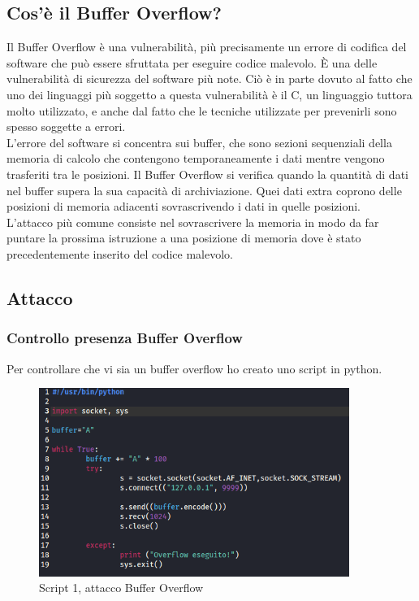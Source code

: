 \documentclass[12pt,letterpaper]{article} %
\begin{document}
\subsection{Cos'è  il Buffer Overflow?}
Il Buffer Overflow è una vulnerabilità, più precisamente un errore di codifica del software che può essere sfruttata per eseguire codice malevolo. È una delle vulnerabilità di sicurezza del software più note. Ciò è in parte dovuto al fatto che uno dei linguaggi più soggetto a questa vulnerabilità è il C, un linguaggio tuttora molto utilizzato, e anche dal fatto che  le tecniche utilizzate per prevenirli sono spesso soggette a errori.\\
L'errore del software si concentra sui buffer, che sono sezioni sequenziali della memoria di calcolo che contengono temporaneamente i dati mentre vengono trasferiti tra le posizioni. Il Buffer Overflow si verifica quando la quantità di dati nel buffer supera la sua capacità di archiviazione. Quei dati extra coprono delle posizioni di memoria adiacenti sovrascrivendo i dati in quelle posizioni.\\
 L'attacco più comune consiste nel sovrascrivere la memoria in modo da far puntare la prossima istruzione a una posizione di memoria dove è stato precedentemente inserito del codice malevolo.
\subsection{Attacco}
\subsubsection{Controllo presenza Buffer Overflow}
Per controllare che vi sia un buffer overflow ho creato uno script in python. 
\begin{figure}[h!]
  \centering
  \includegraphics[width=0.9\textwidth]{python1.png}
  \caption{Script 1, attacco Buffer Overflow}
  \label{fig:p1}
\end{figure}
\end{document}
